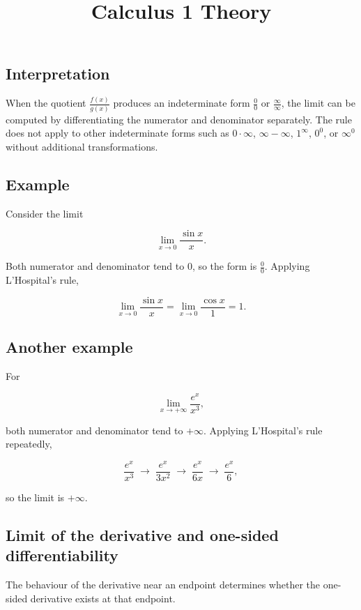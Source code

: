 \documentclass[11pt,a4paper]{article} \usepackage[T1]{fontenc}
\theoremstyle{plain} \newtheorem{theorem}{Theorem} \title{Calculus 1 Theory}
\begin{document}
\subsection*{Interpretation}

When the quotient $\frac{f(x)}{g(x)}$ produces an indeterminate form
$\frac{0}{0}$ or $\frac{\infty}{\infty}$, the limit can be computed by
differentiating the numerator and denominator separately. The rule does not
apply to other indeterminate forms such as $0\cdot\infty$, $\infty-\infty$,
$1^\infty$, $0^0$, or $\infty^0$ without additional transformations.

\subsection*{Example}

Consider the limit

\[
\lim_{x\to 0} \frac{\sin x}{x}.
\]

Both numerator and denominator tend to $0$, so the form is $\frac{0}{0}$.
Applying L'Hospital's rule,

\[
\lim_{x\to 0} \frac{\sin x}{x} = \lim_{x\to 0} \frac{\cos x}{1} = 1.
\]

\subsection*{Another example}

For

\[
\lim_{x\to +\infty} \frac{e^x}{x^3},
\]

both numerator and denominator tend to $+\infty$. Applying L'Hospital's rule
repeatedly,

\[
\frac{e^x}{x^3} \;\longrightarrow\; \frac{e^x}{3x^2} \;\longrightarrow\; \frac{e^x}{6x} \;\longrightarrow\; \frac{e^x}{6},
\]

so the limit is $+\infty$.

\subsection {Limit of the derivative and one-sided differentiability}

The behaviour of the derivative near an endpoint determines whether the
one-sided derivative exists at that endpoint.
\end{document}
